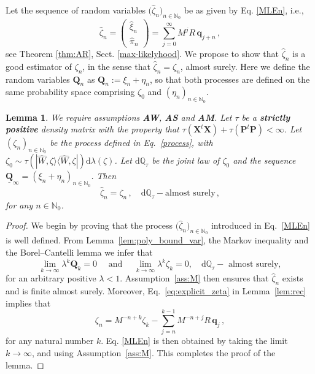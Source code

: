 \documentclass[12pt]{article}
\newtheorem{lemma}[theorem]{Lemma}
\newcommand{\ket}[1]{|{#1}\rangle}
\newcommand{\bra}[1]{\langle{#1}|}
\renewcommand{\d}{{\mathrm d}}
\begin{document}
Let the sequence of random variables $\big(\widehat{\zeta}_n\big)_{n\in \mathbb{N}_0}$ be as given by Eq. \eqref{MLEn}, i.e., 
$$\widehat{\zeta}_n = \left( \begin{array}{c}
\widehat{\xi}_n \\
\widehat{\pi}_n
\end{array}
\right) = \sum_{j=0}^\infty M^{j} R\, \mathbf q_{j+n}\,,$$
see Theorem \ref{thm:AR}, Sect. \ref{max-likelyhood}.
We propose to show that $\widehat \zeta_n$ is a good estimator of $\zeta_n$, in the sense that $\widehat{\zeta}_n=\zeta_n$, almost surely. Here we define the random variables $\mathbf Q_n$ as  $\mathbf Q_n:=\xi_n+\eta_n$, so that both processes are defined on the same probability space comprising $\zeta_0$  and $(\eta_n)_{n\in\mathbb N_0}$.
\begin{lemma}\label{lem:equality_estimator}
	We require assumptions  {\bf{AW}}, {\bf{AS}} and {\bf{AM}}. Let $\tau$ be a {\bf{strictly positive}} density matrix with the property that 
	 $\tau(\mathbf X^t\mathbf X)+\tau(\mathbf P^t\mathbf P)<\infty$. Let $(\zeta_n)_{n\in\mathbb N_0}$ be the process defined in Eq.~\eqref{process}, with $\zeta_0\sim \tau(\ket{\widehat W,\zeta}\bra{\widehat W,\zeta})\d\lambda(\zeta)$. Let 
	 $\d\mathbb Q_\tau$ be the joint law of $\zeta_0$ and the sequence $\underline{\mathbf{Q}}_{\infty}=(\xi_n+ \eta_n)_{n\in\mathbb N_0}$.
	 Then
	$$\widehat{\zeta}_n= \zeta_n\,, \quad \d\mathbb{Q}_{\tau}-\text{almost surely}\,,$$
	for any $n \in \mathbb N_0$.

	\end{lemma}

\begin{proof}
	We begin by proving that the process $\big(\widehat \zeta_n \big)_{n \in \mathbb{N}_0}$ introduced in Eq.~\eqref{MLEn} is well defined. From Lemma~\ref{lem:poly_bound_var}, the Markov inequality and the Borel--Cantelli lemma we infer that 
		$$\lim_{k\to\infty}\lambda^k\mathbf Q_k=0\quad\mbox{ and }\quad \lim_{k\to\infty}\lambda^k\zeta_k=0,\quad \d\mathbb Q_{\tau}-\text{ almost surely},$$
		for an arbitrary positive $\lambda<1$.
Assumption~\ref{ass:M} then ensures that $\widehat \zeta_n$ exists and is finite almost surely.
	Moreover, Eq.~\eqref{eq:explicit_zeta} in Lemma~\ref{lem:rec} implies that
	$$\zeta_n=M^{-n+k}\zeta_{k} - \sum_{j=n}^{k-1}M^{-n+j}R\,\mathbf q_{j}\,,$$
	for any natural number $k$.
	Eq. \eqref{MLEn} is then obtained by taking the limit $k\to\infty$, and using Assumption~\ref{ass:M}. This completes the proof of the lemma.
\end{proof}
\end{document}

